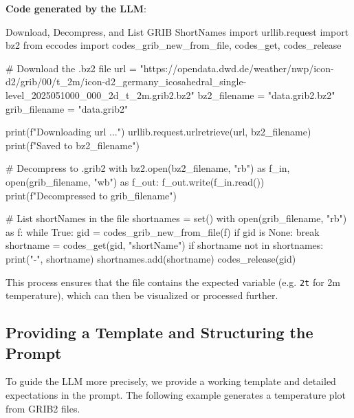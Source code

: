 \textbf{Code generated by the LLM}:

\begin{codeonly}{Download, Decompress, and List GRIB ShortNames}
import urllib.request
import bz2
from eccodes import codes_grib_new_from_file, codes_get, codes_release

# Download the .bz2 file
url = "https://opendata.dwd.de/weather/nwp/icon-d2/grib/00/t_2m/icon-d2_germany_icosahedral_single-level_2025051000_000_2d_t_2m.grib2.bz2"
bz2_filename = "data.grib2.bz2"
grib_filename = "data.grib2"

print(f"Downloading {url} ...")
urllib.request.urlretrieve(url, bz2_filename)
print(f"Saved to {bz2_filename}")

# Decompress to .grib2
with bz2.open(bz2_filename, "rb") as f_in, open(grib_filename, "wb") as f_out:
    f_out.write(f_in.read())
print(f"Decompressed to {grib_filename}")

# List shortNames in the file
shortnames = set()
with open(grib_filename, "rb") as f:
    while True:
        gid = codes_grib_new_from_file(f)
        if gid is None:
            break
        shortname = codes_get(gid, "shortName")
        if shortname not in shortnames:
            print("-", shortname)
            shortnames.add(shortname)
        codes_release(gid)
\end{codeonly}

This process ensures that the file contains the expected variable (e.g. \texttt{2t} for 2m temperature), which can then be visualized or processed further.


%
\subsection*{Providing a Template and Structuring the Prompt}

To guide the LLM more precisely, we provide a working template and detailed expectations in the prompt. The following example generates a temperature plot from GRIB2 files.


